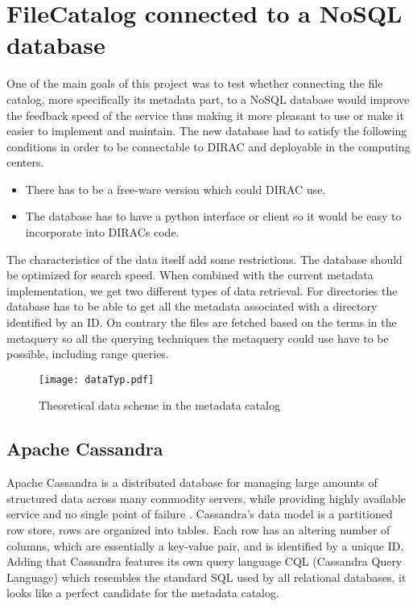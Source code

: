 \chapter{FileCatalog connected to a NoSQL database}
\label{chap:databases}
One of the main goals of this project was to test whether connecting the 
file catalog, more specifically its metadata part, to a NoSQL database would 
improve the feedback speed of the service thus making it more pleasant to use
or make it easier to implement and maintain. The new database had to satisfy the
following conditions in order to be connectable to DIRAC and deployable in
the computing centers.

\begin{itemize}
\item There has to be a free-ware version which could DIRAC use.
\item The database has to have a python interface or client so it would be easy
to incorporate into DIRACs code.
\end{itemize}

The characteristics of the data itself add some restrictions. The database should be
optimized for search speed. When combined with the current metadata implementation, we
get two different types of data retrieval. For directories 
the database has to be able to get all the metadata associated with a directory
identified by an ID. On contrary the files are fetched based on the terms in the metaquery so
all the querying techniques the metaquery could use have to be possible, including
range queries. 

\begin{figure}[h]
\centering
\texttt{[image: dataTyp.pdf]}
\caption{Theoretical data scheme in the metadata catalog}
\label{fig:theoDataScheme}
\end{figure}


\section{Apache Cassandra}
Apache Cassandra is a distributed database for managing large amounts of structured data 
across many commodity servers, while providing highly available service and no single point 
of failure \cite{cassandra}. Cassandra's data model is a
partitioned row store, rows are organized into tables. Each row
has an altering number of columns, which are essentially a
key-value pair, and is identified by a unique ID. Adding that Cassandra features
its own query language CQL (Cassandra Query Language) which resembles the standard SQL 
used by all relational databases, it looks like a perfect candidate for the metadata catalog.

